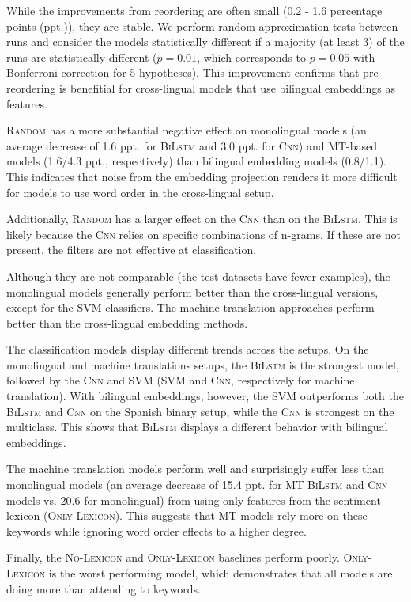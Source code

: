 \documentclass[a4paper,11pt,twocolumn,twoside]{article}
\newcommand{\random}{\textsc{Random}\xspace}
\newcommand{\onlylex}{\textsc{Only-Lexicon}\xspace}
\newcommand{\nolex}{\textsc{No-Lexicon}\xspace}
\newcommand{\bilstm}{\textsc{BiLstm}\xspace}
\newcommand{\cnn}{\textsc{Cnn}\xspace}
\begin{document}
While the improvements from reordering are often small (0.2 - 1.6 percentage points (ppt.)), they are stable. We perform random approximation tests \cite{Yeh2000} between runs and consider the models statistically different if a majority (at least 3) of the runs are statistically different ($p=0.01$, which corresponds to $p=0.05$ with Bonferroni correction for 5 hypotheses). This improvement confirms that pre-reordering is benefitial for cross-lingual models that use bilingual embeddings as features.

\random has a more substantial negative effect on monolingual models (an average decrease of 1.6 ppt. for \bilstm and 3.0 ppt. for \cnn) and MT-based models (1.6/4.3 ppt., respectively) than bilingual embedding models (0.8/1.1). This indicates that noise from the embedding projection renders it more difficult for models to use word order in the cross-lingual setup.

Additionally, \random has a larger effect on the \cnn than on the \bilstm. This is likely because the \cnn relies on specific combinations of n-grams. If these are not present, the filters are not effective at classification.

Although they are not comparable (the test datasets have fewer examples), the monolingual models generally perform better than the cross-lingual versions, except for the SVM classifiers. The machine translation approaches perform better than the cross-lingual embedding methods.

The classification models display different trends across the setups. On the monolingual and machine translations setups, the \bilstm is the strongest model, followed by the \cnn and SVM (SVM and \cnn, respectively for machine translation). With bilingual embeddings, however, the SVM outperforms both the \bilstm and \cnn on the Spanish binary setup, while the \cnn is strongest on the multiclass.  This shows that \bilstm displays a different behavior with bilingual embeddings.

The machine translation models perform well and surprisingly suffer less than monolingual models (an average decrease of 15.4 ppt. for MT \bilstm and \cnn models vs. 20.6 for monolingual)  from using only features from the sentiment lexicon (\onlylex). This suggests that MT models rely more on these keywords while ignoring word order effects to a higher degree.

Finally, the \nolex and \onlylex baselines perform poorly. \onlylex is the worst performing model, which demonstrates that all models are doing more than attending to keywords.
\end{document}
